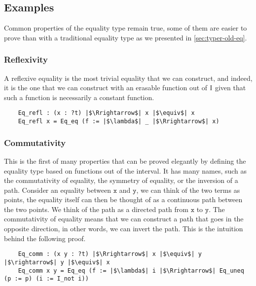 \documentclass[12pt,twoside,maitrise]{dms}
\theoremstyle{definition}
\numberwithin{equation}{section}
\numberwithin{table}{chapter}
\numberwithin{figure}{chapter}
\newcommand\id[1] {\texttt{#1}}
\begin{document}
\subsection{Examples}\label{subsec:eq-examples}
Common properties of the equality type remain true, some of them are easier to
prove than with a traditional equality type as we presented in
\autoref{sec:typer-old-eq}.

\subsubsection*{Reflexivity}
A reflexive equality is the most trivial equality that we can construct, and
indeed, it is the one that we can construct with an erasable function out of
$\mathrm{I}$ given that such a function is necessarily a constant function.

\begin{verbatim}
    Eq_refl : (x : ?t) |$\Rrightarrow$| x |$\equiv$| x
    Eq_refl x = Eq_eq (f := |$\lambda$| _ |$\Rrightarrow$| x)
\end{verbatim}

\subsubsection*{Commutativity}
This is the first of many properties that can be proved elegantly by defining
the equality type based on functions out of the interval. It has many names,
such as the commutativity of equality, the symmetry of equality, or the
inversion of a path. Consider an equality between $\id{x}$ and $\id{y}$, we can
think of the two terms as points, the equality itself can then be thought of as
a continuous path between the two points. We think of the path as a directed
path from $\id{x}$ to $\id{y}$. The commutativity of equality means that we can
construct a path that goes in the opposite direction, in other words, we can
invert the path. This is the intuition behind the following proof.

\begin{verbatim}
    Eq_comm : (x y : ?t) |$\Rrightarrow$| x |$\equiv$| y |$\rightarrow$| y |$\equiv$| x
    Eq_comm x y = Eq_eq (f := |$\lambda$| i |$\Rrightarrow$| Eq_uneq (p := p) (i := I_not i))
\end{verbatim}
\end{document}
